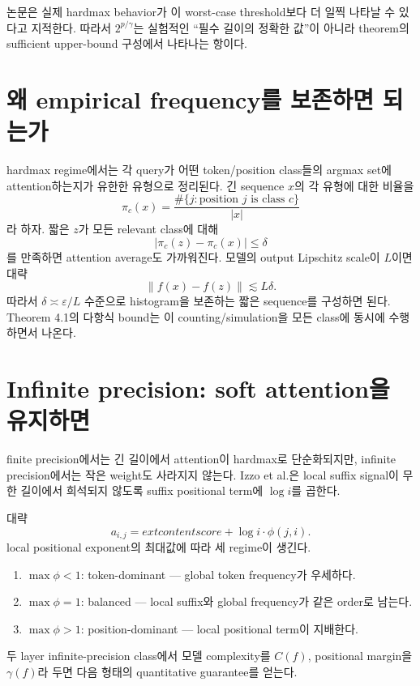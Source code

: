 \documentclass[11pt,a4paper,oneside,openany]{memoir}
\newcommand{\norm}[1]{\left\lVert #1\right\rVert}
\newcommand{\abs}[1]{\left\lvert #1\right\rvert}
\theoremstyle{definition}
\begin{document}
\begin{paperbox}
논문은 실제 hardmax behavior가 이 worst-case threshold보다 더 일찍 나타날 수 있다고 지적한다.
따라서 $2^{p/\gamma}$는 실험적인 ``필수 길이의 정확한 값''이 아니라 theorem의 sufficient upper-bound 구성에서 나타나는 항이다.
\end{paperbox}

\section{왜 empirical frequency를 보존하면 되는가}

hardmax regime에서는 각 query가 어떤 token/position class들의 argmax set에 attention하는지가 유한한 유형으로 정리된다.
긴 sequence $x$의 각 유형에 대한 비율을
\[
\pi_c(x)=\frac{\#\{j:\text{position }j\text{ is class }c\}}{|x|}
\]
라 하자.
짧은 $z$가 모든 relevant class에 대해
\[
\abs{\pi_c(z)-\pi_c(x)}\le\delta
\]
를 만족하면 attention average도 가까워진다.
모델의 output Lipschitz scale이 $L$이면 대략
\[
\norm{f(x)-f(z)}\lesssim L\delta.
\]
따라서 $\delta\asymp\varepsilon/L$ 수준으로 histogram을 보존하는 짧은 sequence를 구성하면 된다.
Theorem 4.1의 다항식 bound는 이 counting/simulation을 모든 class에 동시에 수행하면서 나온다.

\section{Infinite precision: soft attention을 유지하면}

finite precision에서는 긴 길이에서 attention이 hardmax로 단순화되지만, infinite precision에서는 작은 weight도 사라지지 않는다.
Izzo et al.은 local suffix signal이 무한 길이에서 희석되지 않도록 suffix positional term에 $\log i$를 곱한다.

대략
\[
a_{i,j}
=	ext{content score}
+\log i\cdot\phi(j,i).
\]
local positional exponent의 최대값에 따라 세 regime이 생긴다.

\begin{enumerate}
\item $\max\phi<1$: token-dominant --- global token frequency가 우세하다.
\item $\max\phi=1$: balanced --- local suffix와 global frequency가 같은 order로 남는다.
\item $\max\phi>1$: position-dominant --- local positional term이 지배한다.
\end{enumerate}

두 layer infinite-precision class에서 모델 complexity를 $C(f)$, positional margin을 $\gamma(f)$라 두면 다음 형태의 quantitative guarantee를 얻는다.
\end{document}
